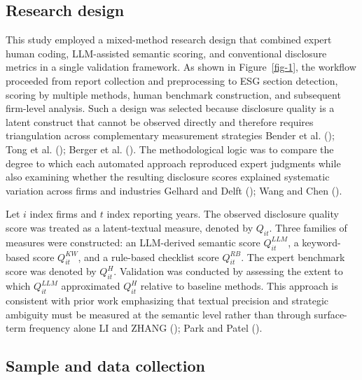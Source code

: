\documentclass[
  12pt,
]{article}
\begin{document}
\subsection{Research design}\label{research-design}

This study employed a mixed-method research design that combined expert
human coding, LLM-assisted semantic scoring, and conventional disclosure
metrics in a single validation framework. As shown in
Figure~\ref{fig-1}, the workflow proceeded from report collection and
preprocessing to ESG section detection, scoring by multiple methods,
human benchmark construction, and subsequent firm-level analysis. Such a
design was selected because disclosure quality is a latent construct
that cannot be observed directly and therefore requires triangulation
across complementary measurement strategies Bender et al.
(); Tong et al.
(); Berger et al.
(). The methodological logic was to
compare the degree to which each automated approach reproduced expert
judgments while also examining whether the resulting disclosure scores
explained systematic variation across firms and industries Gelhard and
Delft (); Wang and Chen
().

Let \(i\) index firms and \(t\) index reporting years. The observed
disclosure quality score was treated as a latent-textual measure,
denoted by \(Q_{it}\). Three families of measures were constructed: an
LLM-derived semantic score \(Q^{LLM}_{it}\), a keyword-based score
\(Q^{KW}_{it}\), and a rule-based checklist score \(Q^{RB}_{it}\). The
expert benchmark score was denoted by \(Q^{H}_{it}\). Validation was
conducted by assessing the extent to which \(Q^{LLM}_{it}\) approximated
\(Q^{H}_{it}\) relative to baseline methods. This approach is consistent
with prior work emphasizing that textual precision and strategic
ambiguity must be measured at the semantic level rather than through
surface-term frequency alone LI and ZHANG ();
Park and Patel ().

\subsection{Sample and data
collection}\label{sample-and-data-collection}
\end{document}
